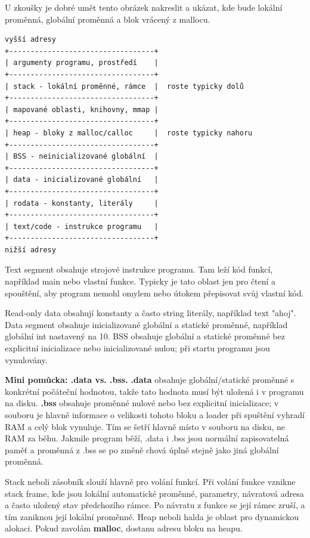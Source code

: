 \documentclass[11pt,a4paper]{article}
\newcommand{\itpr}[1]{\medskip\noindent\colorbox{green!8}{\parbox{\dimexpr\linewidth-2\fboxsep}{#1}}\medskip}
\begin{document}
U zkoušky je dobré umět tento obrázek nakreslit a ukázat, kde bude lokální proměnná, globální proměnná a blok vrácený z mallocu.

\newpage
\begin{codebox}
\small
\begin{verbatim}
vyšší adresy
+----------------------------------+
| argumenty programu, prostředí    |
+----------------------------------+
| stack - lokální proměnné, rámce  |  roste typicky dolů
+----------------------------------+
| mapované oblasti, knihovny, mmap |
+----------------------------------+
| heap - bloky z malloc/calloc     |  roste typicky nahoru
+----------------------------------+
| BSS - neinicializované globální  |
+----------------------------------+
| data - inicializované globální   |
+----------------------------------+
| rodata - konstanty, literály     |
+----------------------------------+
| text/code - instrukce programu   |
+----------------------------------+
nižší adresy
\end{verbatim}
\end{codebox}

Text segment obsahuje strojové instrukce programu. Tam leží kód funkcí, například main nebo vlastní funkce. Typicky je tato oblast jen pro čtení a spouštění, aby program nemohl omylem nebo útokem přepisovat svůj vlastní kód.

Read-only data obsahují konstanty a často string literály, například text "ahoj". Data segment obsahuje inicializované globální a statické proměnné, například globální int nastavený na 10. BSS obsahuje globální a statické proměnné bez explicitní inicializace nebo inicializované nulou; při startu programu jsou vynulovány.

\itpr{\textbf{Mini pomůcka: .data vs. .bss.} \textbf{.data} obsahuje globální/statické proměnné s konkrétní počáteční hodnotou, takže tato hodnota musí být uložená i v programu na disku. \textbf{.bss} obsahuje proměnné nulové nebo bez explicitní inicializace; v souboru je hlavně informace o velikosti tohoto bloku a loader při spuštění vyhradí RAM a celý blok vynuluje. Tím se šetří hlavně místo v souboru na disku, ne RAM za běhu. Jakmile program běží, .data i .bss jsou normální zapisovatelná paměť a proměnná z .bss se po změně chová úplně stejně jako jiná globální proměnná.}

Stack neboli zásobník slouží hlavně pro volání funkcí. Při volání funkce vznikne stack frame, kde jsou lokální automatické proměnné, parametry, návratová adresa a často uložený stav předchozího rámce. Po návratu z funkce se její rámec zruší, a tím zaniknou její lokální proměnné. Heap neboli halda je oblast pro dynamickou alokaci. Pokud zavolám \textbf{malloc}, dostanu adresu bloku na heapu.
\end{document}
